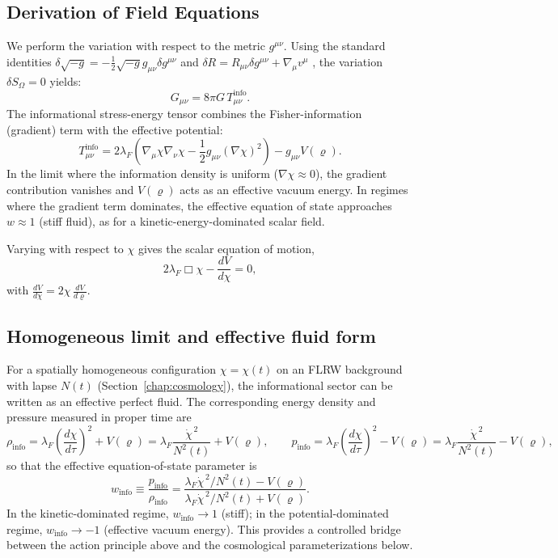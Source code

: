 \subsection{Derivation of Field Equations}
We perform the variation with respect to the metric $g^{\mu\nu}$.
Using the standard identities $\delta \sqrt{-g} = -\frac{1}{2}\sqrt{-g} g_{\mu\nu} \delta g^{\mu\nu}$ and $\delta R = R_{\mu\nu} \delta g^{\mu\nu} + \nabla_\mu v^\mu$ \cite{Carroll2004}, the variation $\delta S_{\Omega} = 0$ yields:
\begin{equation}
    G_{\mu\nu} = 8\pi G\, T_{\mu\nu}^{\text{info}}.
\end{equation}
The informational stress-energy tensor combines the Fisher-information (gradient) term with the effective potential:
\begin{equation}
    T_{\mu\nu}^{\text{info}} =
    2\lambda_F \left( \nabla_\mu \chi \nabla_\nu \chi - \frac{1}{2} g_{\mu\nu} (\nabla \chi)^2 \right)
    - g_{\mu\nu} V(\varrho).
\end{equation}
In the limit where the information density is uniform ($\nabla \chi \approx 0$), the gradient contribution vanishes and $V(\varrho)$ acts as an effective vacuum energy. In regimes where the gradient term dominates, the effective equation of state approaches $w \approx 1$ (stiff fluid), as for a kinetic-energy-dominated scalar field.

Varying with respect to $\chi$ gives the scalar equation of motion,
\begin{equation}
    2\lambda_F \Box \chi - \frac{dV}{d\chi} = 0,
\end{equation}
with $\frac{dV}{d\chi} = 2\chi\,\frac{dV}{d\varrho}$.

\subsection{Homogeneous limit and effective fluid form}
For a spatially homogeneous configuration $\chi=\chi(t)$ on an FLRW background with lapse $N(t)$ (Section~\ref{chap:cosmology}), the informational sector can be written as an effective perfect fluid. The corresponding energy density and pressure measured in proper time are
\begin{equation}
    \rho_{\mathrm{info}} = \lambda_F \left(\frac{d\chi}{d\tau}\right)^{\!2} + V(\varrho)
    = \lambda_F \frac{\dot{\chi}^{\,2}}{N^2(t)} + V(\varrho), \qquad
    p_{\mathrm{info}} = \lambda_F \left(\frac{d\chi}{d\tau}\right)^{\!2} - V(\varrho)
    = \lambda_F \frac{\dot{\chi}^{\,2}}{N^2(t)} - V(\varrho),
\end{equation}
so that the effective equation-of-state parameter is
\begin{equation}
    w_{\mathrm{info}} \equiv \frac{p_{\mathrm{info}}}{\rho_{\mathrm{info}}}
    = \frac{\lambda_F \dot{\chi}^{\,2}/N^2(t) - V(\varrho)}{\lambda_F \dot{\chi}^{\,2}/N^2(t) + V(\varrho)}.
\end{equation}
In the kinetic-dominated regime, $w_{\mathrm{info}}\to 1$ (stiff); in the potential-dominated regime, $w_{\mathrm{info}}\to -1$ (effective vacuum energy). This provides a controlled bridge between the action principle above and the cosmological parameterizations below.

